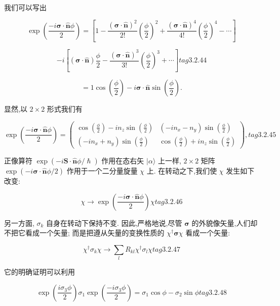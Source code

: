 我们可以写出

$$
\exp \left( \frac{-i\mathbf{\sigma } \cdot \widehat{\mathbf{n}}\phi }{2}\right) = \left\lbrack {1 - \frac{{\left( \mathbf{\sigma } \cdot \widehat{\mathbf{n}}\right) }^{2}}{2!}{\left( \frac{\phi }{2}\right) }^{2} + \frac{{\left( \mathbf{\sigma } \cdot \widehat{\mathbf{n}}\right) }^{4}}{4!}{\left( \frac{\phi }{2}\right) }^{4} - \cdots }\right\rbrack
$$

$$
- i\left\lbrack {\left( {\mathbf{\sigma } \cdot \widehat{\mathbf{n}}}\right) \frac{\phi }{2} - \frac{{\left( \mathbf{\sigma } \cdot \widehat{\mathbf{n}}\right) }^{3}}{3!}{\left( \frac{\phi }{2}\right) }^{3} + \cdots }\right\rbrack tag{3. 2.44}
$$

$$
= 1\cos \left( \frac{\phi }{2}\right) - i\mathbf{\sigma } \cdot \widehat{\mathbf{n}}\sin \left( \frac{\phi }{2}\right) .
$$

显然,以 $2 \times 2$ 形式我们有

$$
\exp \left( \frac{-i\mathbf{\sigma } \cdot \widehat{\mathbf{n}}\phi }{2}\right) = \left( \begin{array}{ll} \cos \left( \frac{\phi }{2}\right) - i{n}_{z}\sin \left( \frac{\phi }{2}\right) & \left( {-i{n}_{x} - {n}_{y}}\right) \sin \left( \frac{\phi }{2}\right) \\ \left( {-i{n}_{x} + {n}_{y}}\right) \sin \left( \frac{\phi }{2}\right) & \cos \left( \frac{\phi }{2}\right) + i{n}_{z}\sin \left( \frac{\phi }{2}\right) \end{array}\right) , tag{3. 2.45}
$$

正像算符 $\exp \left( {-i\mathbf{S} \cdot \widehat{\mathbf{n}}\phi /\hslash }\right)$ 作用在态右矢 $|\alpha \rangle$ 上一样, $2 \times 2$ 矩阵 $\exp \left( {-i\mathbf{\sigma } \cdot \widehat{\mathbf{n}}\phi /2}\right)$ 作用于一个二分量旋量 $\chi$ 上. 在转动之下,我们使 $\chi$ 发生如下改变:

$$
\chi \rightarrow \exp \left( \frac{-i\mathbf{\sigma } \cdot \widehat{\mathbf{n}}\phi }{2}\right) \chi tag{3.2.46}
$$

另一方面, ${\sigma }_{k}$ 自身在转动下保持不变. 因此,严格地说,尽管 $\mathbf{\sigma }$ 的外貌像矢量,人们却不把它看成一个矢量; 而是把遵从矢量的变换性质的 ${\chi }^{ \dagger }\mathbf{\sigma }\chi$ 看成一个矢量:

$$
{\chi }^{ \dagger }{\sigma }_{k}\chi \rightarrow \mathop{\sum }\limits_{l}{R}_{kl}{\chi }^{ \dagger }{\sigma }_{l}\chi tag{3.2.47}
$$

它的明确证明可以利用

$$
\exp \left( \frac{i{\sigma }_{3}\phi }{2}\right) {\sigma }_{1}\exp \left( \frac{-i{\sigma }_{3}\phi }{2}\right) = {\sigma }_{1}\cos \phi - {\sigma }_{2}\sin \phi tag{3. 2.48}
$$

